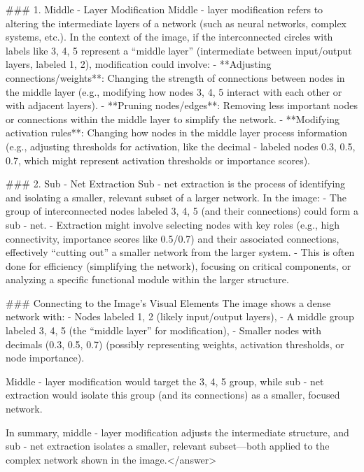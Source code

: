 ### 1. Middle - Layer Modification  
Middle - layer modification refers to altering the intermediate layers of a network (such as neural networks, complex systems, etc.). In the context of the image, if the interconnected circles with labels like 3, 4, 5 represent a “middle layer” (intermediate between input/output layers, labeled 1, 2), modification could involve:  
- **Adjusting connections/weights**: Changing the strength of connections between nodes in the middle layer (e.g., modifying how nodes 3, 4, 5 interact with each other or with adjacent layers).  
- **Pruning nodes/edges**: Removing less important nodes or connections within the middle layer to simplify the network.  
- **Modifying activation rules**: Changing how nodes in the middle layer process information (e.g., adjusting thresholds for activation, like the decimal - labeled nodes 0.3, 0.5, 0.7, which might represent activation thresholds or importance scores).  


### 2. Sub - Net Extraction  
Sub - net extraction is the process of identifying and isolating a smaller, relevant subset of a larger network. In the image:  
- The group of interconnected nodes labeled 3, 4, 5 (and their connections) could form a sub - net.  
- Extraction might involve selecting nodes with key roles (e.g., high connectivity, importance scores like 0.5/0.7) and their associated connections, effectively “cutting out” a smaller network from the larger system.  
- This is often done for efficiency (simplifying the network), focusing on critical components, or analyzing a specific functional module within the larger structure.  


### Connecting to the Image’s Visual Elements  
The image shows a dense network with:  
- Nodes labeled 1, 2 (likely input/output layers),  
- A middle group labeled 3, 4, 5 (the “middle layer” for modification),  
- Smaller nodes with decimals (0.3, 0.5, 0.7) (possibly representing weights, activation thresholds, or node importance).  

Middle - layer modification would target the 3, 4, 5 group, while sub - net extraction would isolate this group (and its connections) as a smaller, focused network.  

In summary, middle - layer modification adjusts the intermediate structure, and sub - net extraction isolates a smaller, relevant subset—both applied to the complex network shown in the image.</answer>